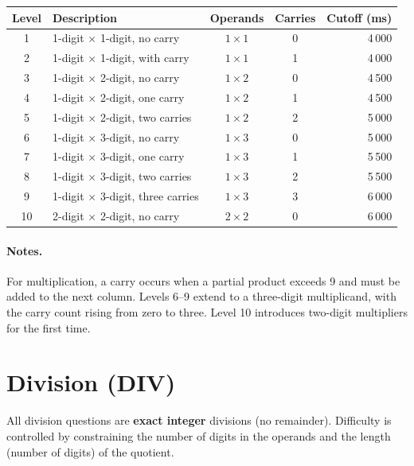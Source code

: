 \documentclass[11pt]{article}
\begin{document}
\begin{longtable}{@{}clccr@{}}
\toprule
\textbf{Level} & \textbf{Description} & \textbf{Operands} & \textbf{Carries} & \textbf{Cutoff (ms)} \\
\midrule
\endhead
1  & 1-digit $\times$ 1-digit, no carry          & $1 \times 1$ & 0 & 4\,000 \\
2  & 1-digit $\times$ 1-digit, with carry        & $1 \times 1$ & 1 & 4\,000 \\
3  & 1-digit $\times$ 2-digit, no carry          & $1 \times 2$ & 0 & 4\,500 \\
4  & 1-digit $\times$ 2-digit, one carry         & $1 \times 2$ & 1 & 4\,500 \\
5  & 1-digit $\times$ 2-digit, two carries       & $1 \times 2$ & 2 & 5\,000 \\
6  & 1-digit $\times$ 3-digit, no carry          & $1 \times 3$ & 0 & 5\,000 \\
7  & 1-digit $\times$ 3-digit, one carry         & $1 \times 3$ & 1 & 5\,500 \\
8  & 1-digit $\times$ 3-digit, two carries       & $1 \times 3$ & 2 & 5\,500 \\
9  & 1-digit $\times$ 3-digit, three carries     & $1 \times 3$ & 3 & 6\,000 \\
10 & 2-digit $\times$ 2-digit, no carry          & $2 \times 2$ & 0 & 6\,000 \\
\bottomrule
\end{longtable}

\paragraph{Notes.}
For multiplication, a carry occurs when a partial product exceeds 9 and must be added to the
next column.  Levels 6–9 extend to a three-digit multiplicand, with the carry count rising
from zero to three.  Level 10 introduces two-digit multipliers for the first time.

\section{Division (DIV)}

All division questions are \textbf{exact integer} divisions (no remainder). Difficulty is controlled by constraining the number of digits in the operands and the length (number of digits) of the quotient.
\end{document}
